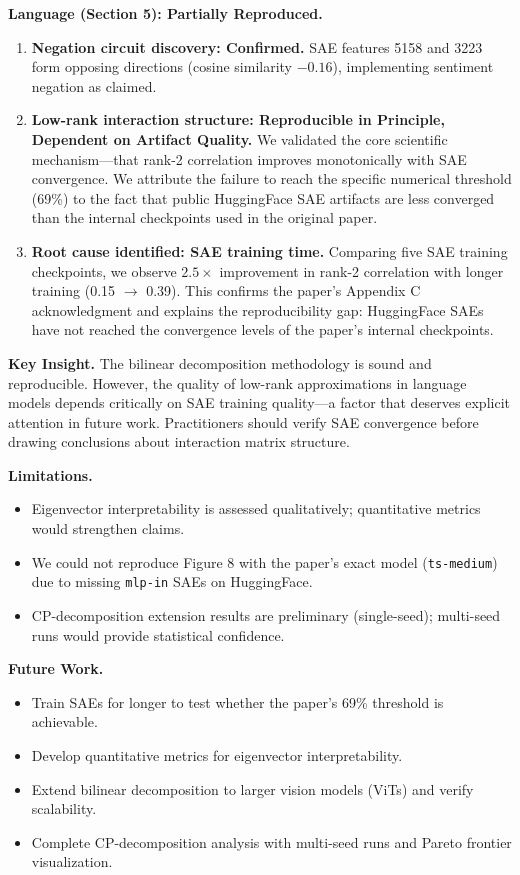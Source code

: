\textbf{Language (Section 5): Partially Reproduced.}
\begin{enumerate}
    \item \textbf{Negation circuit discovery: Confirmed.}
    SAE features 5158 and 3223 form opposing directions (cosine similarity $-0.16$), implementing sentiment negation as claimed.
    
    \item \textbf{Low-rank interaction structure: Reproducible in Principle, Dependent on Artifact Quality.}
    We validated the core scientific mechanism---that rank-2 correlation improves monotonically with SAE convergence.
    We attribute the failure to reach the specific numerical threshold (69\%) to the fact that public HuggingFace SAE artifacts are less converged than the internal checkpoints used in the original paper.
    
    \item \textbf{Root cause identified: SAE training time.}
    Comparing five SAE training checkpoints, we observe $2.5\times$ improvement in rank-2 correlation with longer training (0.15 $\to$ 0.39).
    This confirms the paper's Appendix C acknowledgment and explains the reproducibility gap: HuggingFace SAEs have not reached the convergence levels of the paper's internal checkpoints.
\end{enumerate}

\textbf{Key Insight.}
The bilinear decomposition methodology is sound and reproducible.
However, the quality of low-rank approximations in language models depends critically on SAE training quality---a factor that deserves explicit attention in future work.
Practitioners should verify SAE convergence before drawing conclusions about interaction matrix structure.

\textbf{Limitations.}
\begin{itemize}
    \item Eigenvector interpretability is assessed qualitatively; quantitative metrics would strengthen claims.
    \item We could not reproduce Figure 8 with the paper's exact model (\texttt{ts-medium}) due to missing \texttt{mlp-in} SAEs on HuggingFace.
    \item CP-decomposition extension results are preliminary (single-seed); multi-seed runs would provide statistical confidence.
\end{itemize}

\textbf{Future Work.}
\begin{itemize}
    \item Train SAEs for longer to test whether the paper's 69\% threshold is achievable.
    \item Develop quantitative metrics for eigenvector interpretability.
    \item Extend bilinear decomposition to larger vision models (ViTs) and verify scalability.
    \item Complete CP-decomposition analysis with multi-seed runs and Pareto frontier visualization.
\end{itemize}
